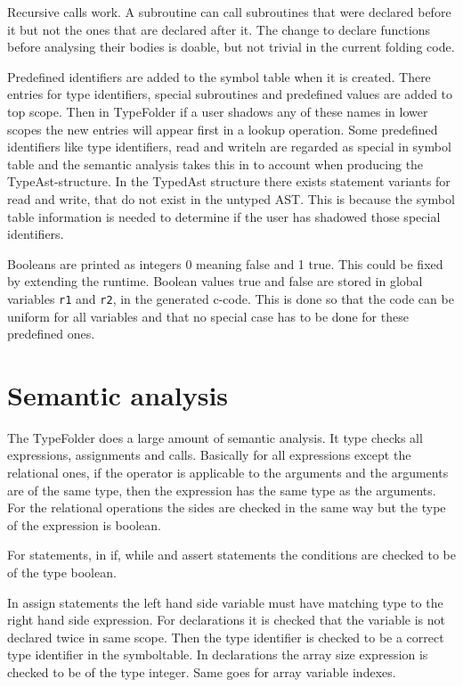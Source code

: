 \documentclass[12pt,a4paper]{article}
\begin{document}
Recursive calls work. A subroutine can call subroutines that were declared
before it but not the ones that are declared after it. The change to 
declare functions before analysing their bodies is doable, but not trivial
in the current folding code.

Predefined identifiers are added to the symbol table when it is created.  There
entries for type identifiers, special subroutines and predefined values are
added to top scope. Then in TypeFolder if a user shadows any of these names in
lower scopes the new entries will appear first in a lookup operation.
 Some predefined identifiers like type identifiers, read and writeln
are regarded as special in symbol table and the semantic analysis takes this in 
to account when producing the TypeAst-structure. In the TypedAst structure
there exists statement variants for read and write, that do not exist
in the untyped AST. This is because the symbol table information is needed
to determine if the user has shadowed those special identifiers.

Booleans are printed as integers 0 meaning false and 1 true.
This could be fixed by extending the runtime. Boolean values
true and false are stored in global variables \texttt{r1} and \texttt{r2},
in the generated c-code. This is done so that the code can be uniform
for all variables and that no special case has to be done for these 
predefined ones.


\section{Semantic analysis}

The TypeFolder does a large amount of semantic analysis.  It type checks all
expressions, assignments and calls.  Basically for all expressions except the
relational ones, if the operator is applicable to the arguments and the
arguments are of the same type, then the expression has the same type as the
arguments. For the relational operations the sides are checked in the same way
but the type of the expression is boolean.

For statements, in if, while and assert statements the conditions are checked to 
be of the type boolean.

In assign statements the left hand side variable
must have matching type to the right hand side expression.
For declarations it is checked that the variable is not declared twice
in same scope. Then the type identifier is checked to be a correct type
identifier in the symboltable. 
In declarations the array size expression is checked to be of the type integer.
Same goes for array variable indexes.
\end{document}
